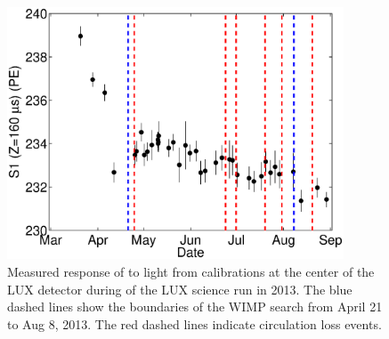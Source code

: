 \begin{figure}[h!]\centering
\includegraphics[width=100mm]{Chapter_XYZ_Corr/Thesis_Corr_Plots/s1_center_fig_3.eps}
\caption{Measured response of to light from \KrCal calibrations at the center of the LUX detector during of the LUX science run in 2013. The blue dashed lines show the boundaries of the WIMP search from April 21 to Aug 8, 2013. The red dashed lines indicate circulation loss events.}
\label{fig:S1_center_time}
\end{figure}


